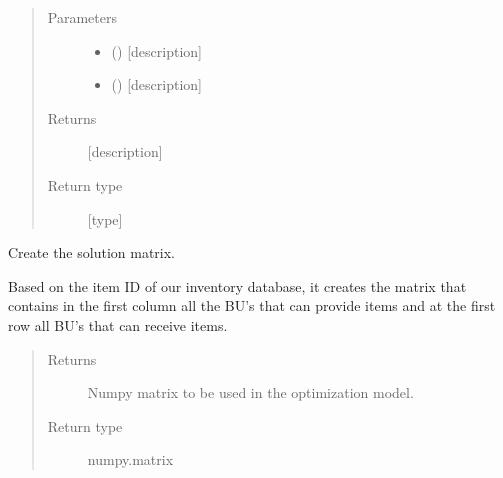\documentclass[letterpaper,10pt,english]{sphinxmanual}
\begin{document}
\begin{fulllineitems}
\begin{fulllineitems}
\begin{itemize}
\end{itemize}
\begin{quote}\begin{description}
\item[{Parameters}] \leavevmode\begin{itemize}
\item {} 
 (\sphinxstyleliteralemphasis{\sphinxupquote{{[}}}\sphinxstyleliteralemphasis{\sphinxupquote{{]}}}) \textendash{} {[}description{]}

\item {} 
 (\sphinxstyleliteralemphasis{\sphinxupquote{{[}}}\sphinxstyleliteralemphasis{\sphinxupquote{{]}}}) \textendash{} {[}description{]}

\end{itemize}

\item[{Returns}] \leavevmode
{[}description{]}

\item[{Return type}] \leavevmode
{[}type{]}

\end{description}\end{quote}

\end{fulllineitems}


\begin{fulllineitems}
\label{\detokenize{source/optimization:optimization.solspace.SolutionSpace.sol_matrix}}
Create the solution matrix.

Based on the item ID of our inventory database, it
creates the matrix that contains in the first column
all the BU’s that can provide items and at the first
row all BU’s that can receive items.
\begin{quote}\begin{description}
\item[{Returns}] \leavevmode
{} \textendash{} Numpy matrix to be used in the optimization model.

\item[{Return type}] \leavevmode
numpy.matrix


\end{description}
\end{quote}
\end{fulllineitems}
\end{fulllineitems}
\end{document}
